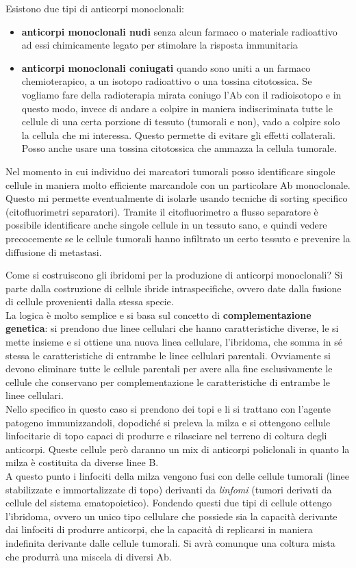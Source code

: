 \documentclass[11pt]{book}
\begin{document}
Esistono due tipi di anticorpi monoclonali:
\begin{itemize}
\item \textbf{anticorpi monoclonali nudi} senza alcun farmaco o materiale radioattivo ad essi chimicamente legato per stimolare la risposta immunitaria
\item \textbf{anticorpi monoclonali coniugati} quando sono uniti a un farmaco chemioterapico, a un isotopo radioattivo o una tossina citotossica. Se vogliamo fare della radioterapia mirata coniugo l’Ab con il radioisotopo e in questo modo, invece di andare a colpire in maniera indiscriminata tutte le cellule di una certa porzione di tessuto (tumorali e non), vado a colpire solo la cellula che mi interessa. Questo permette di evitare gli effetti collaterali. Posso anche usare una tossina citotossica che ammazza la cellula tumorale.
\end{itemize}
      
Nel momento in cui individuo dei marcatori tumorali posso identificare singole cellule in maniera molto efficiente marcandole con un particolare Ab monoclonale. Questo mi permette eventualmente di isolarle usando tecniche di sorting specifico (citofluorimetri separatori). Tramite il citofluorimetro a flusso separatore è possibile identificare anche singole cellule in un tessuto sano, e quindi vedere precocemente se le cellule tumorali hanno infiltrato un certo tessuto e prevenire la diffusione di metastasi.

Come si costruiscono gli ibridomi per la produzione di anticorpi monoclonali? 
Si parte dalla costruzione di cellule ibride intraspecifiche, ovvero date dalla fusione di cellule provenienti dalla stessa specie.\\
La logica è molto semplice e si basa sul concetto di \textbf{complementazione genetica}: si prendono due linee cellulari che hanno caratteristiche diverse, le si mette insieme e si ottiene una nuova linea cellulare, l’ibridoma, che somma in sé stessa le caratteristiche di entrambe le linee cellulari parentali. Ovviamente si devono eliminare tutte le cellule parentali per avere alla fine esclusivamente le cellule che conservano per complementazione le caratteristiche di entrambe le linee cellulari.\\
Nello specifico in questo caso si prendono dei topi e li si trattano con l’agente patogeno immunizzandoli, dopodiché si preleva la milza e si ottengono cellule linfocitarie di topo capaci di produrre e rilasciare nel terreno di coltura degli anticorpi. Queste cellule però daranno un mix di anticorpi policlonali in quanto la milza è costituita da diverse linee B.\\
A questo punto i linfociti della milza vengono fusi con delle cellule tumorali (linee stabilizzate e immortalizzate di topo) derivanti da \emph{linfomi} (tumori derivati da cellule del sistema ematopoietico). Fondendo questi due tipi di cellule ottengo l’ibridoma, ovvero un unico tipo cellulare che possiede sia la capacità derivante dai linfociti di produrre anticorpi, che la capacità di replicarsi in maniera indefinita derivante dalle cellule tumorali. Si avrà comunque una coltura mista che produrrà una miscela di diversi Ab.
\end{document}
